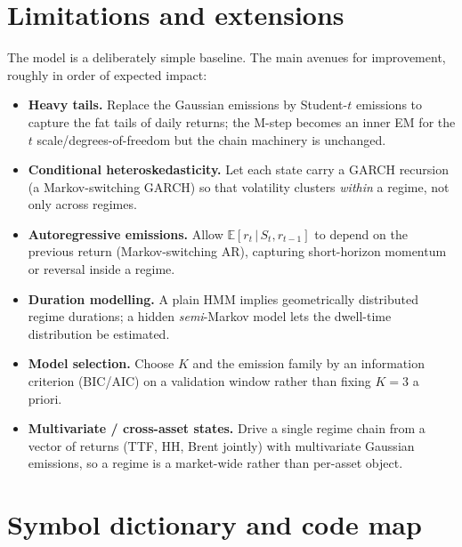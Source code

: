 \documentclass[11pt]{article}
\newcommand{\E}{\mathbb{E}}
\newcommand{\given}{\,\vert\,}
\newcommand{\state}{S}
\newcommand{\obs}{r}
\newcommand{\nstate}{K}
\theoremstyle{plain}
\theoremstyle{definition}
\theoremstyle{remark}
\begin{document}
\section{Limitations and extensions}\label{sec:extensions}

The model is a deliberately simple baseline. The main avenues for improvement,
roughly in order of expected impact:
\begin{itemize}[leftmargin=1.6em]
  \item \textbf{Heavy tails.} Replace the Gaussian emissions by Student-$t$
        emissions to capture the fat tails of daily returns; the M-step becomes
        an inner EM for the $t$ scale/degrees-of-freedom but the chain machinery
        is unchanged.
  \item \textbf{Conditional heteroskedasticity.} Let each state carry a GARCH
        recursion (a Markov-switching GARCH) so that volatility clusters
        \emph{within} a regime, not only across regimes.
  \item \textbf{Autoregressive emissions.} Allow $\E[\obs_t\given\state_t,\obs_{t-1}]$
        to depend on the previous return (Markov-switching AR), capturing
        short-horizon momentum or reversal inside a regime.
  \item \textbf{Duration modelling.} A plain HMM implies geometrically
        distributed regime durations; a hidden \emph{semi}-Markov model lets the
        dwell-time distribution be estimated.
  \item \textbf{Model selection.} Choose $\nstate$ and the emission family by an
        information criterion (BIC/AIC) on a validation window rather than fixing
        $\nstate=3$ a priori.
  \item \textbf{Multivariate / cross-asset states.} Drive a single regime chain
        from a vector of returns (TTF, HH, Brent jointly) with multivariate
        Gaussian emissions, so a regime is a market-wide rather than per-asset
        object.
\end{itemize}

\section{Symbol dictionary and code map}\label{sec:symbols}
\end{document}
